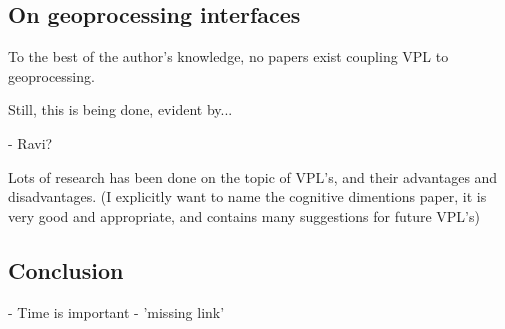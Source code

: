 \subsection{On geoprocessing interfaces}



To the best of the author's knowledge, no papers exist coupling VPL to geoprocessing.

Still, this is being done, evident by...



- Ravi?

Lots of research has been done on the topic of VPL's, and their advantages and disadvantages. 
(I explicitly want to name the cognitive dimentions paper, it is very good and appropriate, and contains many suggestions for future VPL's)



\subsection{Conclusion}

- Time is important 
- 'missing link'


